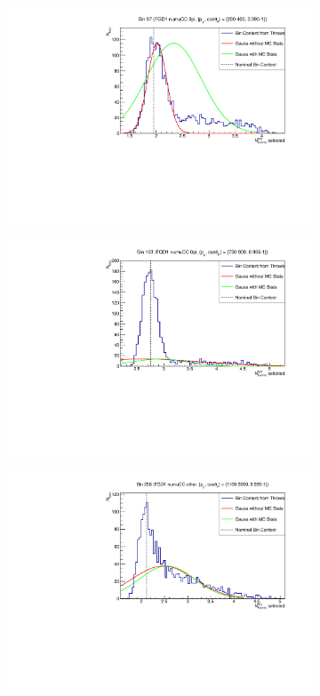 \begin{figure}
\centering
\begin{subfigure}{.49\textwidth}
  \centering
  \includegraphics[width=0.95\linewidth]{figs/detbin_allsysts97}
\end{subfigure}
\begin{subfigure}{.49\textwidth}
  \centering
  \includegraphics[width=0.95\linewidth]{figs/detbin_allsysts103}
\end{subfigure}
\begin{subfigure}{.49\textwidth}
  \centering
  \includegraphics[width=0.95\linewidth]{figs/detbin_allsysts258}

\end{subfigure}
\end{figure}
